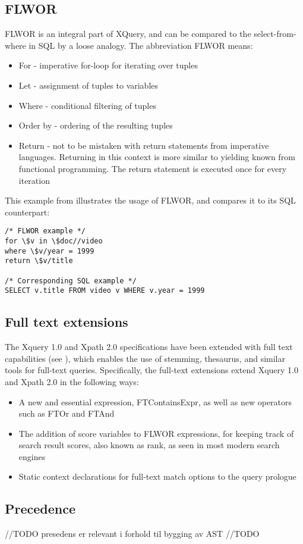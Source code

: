 \subsection{FLWOR}
FLWOR is an integral part of XQuery, and can be compared to the select-from-where in SQL by a loose analogy. The abbreviation FLWOR means:
\begin{itemize}
\item For - imperative for-loop for iterating over tuples
\item Let - assignment of tuples to variables
\item Where - conditional filtering of tuples
\item Order by - ordering of the resulting tuples
\item Return - not to be mistaken with return statements from imperative languages. Returning in this context is more similar to yielding known from functional programming. The return statement is executed once for every iteration
\end{itemize}
This example from \cite{STYL00} illustrates the usage of FLWOR, and compares it to its SQL counterpart:

\begin{verbatim}
/* FLWOR example */
for \$v in \$doc//video
where \$v/year = 1999
return \$v/title

/* Corresponding SQL example */
SELECT v.title FROM video v WHERE v.year = 1999
\end{verbatim}

\subsection{Full text extensions}
The Xquery 1.0  and Xpath 2.0 specifications have been extended with full text capabilities (see \cite{W3C02}), which enables the use of stemming, thesaurus, and similar tools for full-text queries. Specifically, the full-text extensions extend Xquery 1.0 and Xpath 2.0 in the following ways:
\begin{itemize}
\item A new and essential expression, FTContainsExpr, as well as new operators such as FTOr and FTAnd
\item The addition of score variables to FLWOR expressions, for keeping track of search result scores, also known as rank, as seen in most modern search engines
\item Static context declarations for full-text match options to the query prologue
\end{itemize}

\subsection{Precedence}
//TODO
presedens er relevant i forhold til bygging av AST
//TODO
